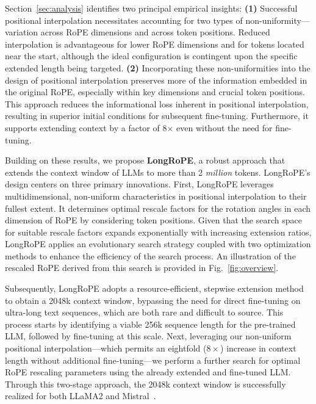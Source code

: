 Section~\ref{sec:analysis} identifies two principal empirical insights: \textbf{(1)} Successful positional interpolation necessitates accounting for two types of non-uniformity—variation across RoPE dimensions and across token positions. Reduced interpolation is advantageous for lower RoPE dimensions and for tokens located near the start, although the ideal configuration is contingent upon the specific extended length being targeted. \textbf{(2)} Incorporating these non-uniformities into the design of positional interpolation preserves more of the information embedded in the original RoPE, especially within key dimensions and crucial token positions. This approach reduces the informational loss inherent in positional interpolation, resulting in superior initial conditions for subsequent fine-tuning. Furthermore, it supports extending context by a factor of 8$\times$ even without the need for fine-tuning.

Building on these results, we propose \textbf{LongRoPE}, a robust approach that extends the context window of LLMs to more than 2 \emph{million} tokens. LongRoPE's design centers on three primary innovations. First, {LongRoPE} leverages multidimensional, non-uniform characteristics in positional interpolation to their fullest extent. It determines optimal rescale factors for the rotation angles in each dimension of RoPE by considering token positions. Given that the search space for suitable rescale factors expands exponentially with increasing extension ratios, {LongRoPE} applies an evolutionary search strategy coupled with two optimization methods to enhance the efficiency of the search process. An illustration of the rescaled RoPE derived from this search is provided in Fig.~\ref{fig:overview}.

Subsequently, {LongRoPE} adopts a resource-efficient, stepwise extension method to obtain a 2048k context window, bypassing the need for direct fine-tuning on ultra-long text sequences, which are both rare and difficult to source. This process starts by identifying a viable 256k sequence length for the pre-trained LLM, followed by fine-tuning at this scale. Next, leveraging our non-uniform positional interpolation—which permits an eightfold ($8\times$) increase in context length without additional fine-tuning—we perform a further search for optimal RoPE rescaling parameters using the already extended and fine-tuned LLM. Through this two-stage approach, the 2048k context window is successfully realized for both LLaMA2 and Mistral~\cite{mistral}.

